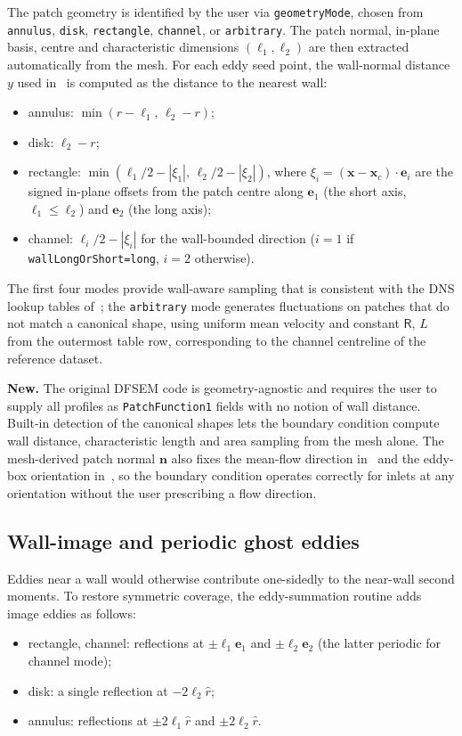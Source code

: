 \documentclass[
 amsmath,amssymb,
 aps,
 twocolumn,
]{revtex4-2}
\renewcommand{\vec}[1]{\boldsymbol{#1}}
\newcommand{\bR}{\mathsf{R}}
\newcommand{\improv}[1]{\par\medskip\noindent\textbf{#1}\hspace{0.5em}\ignorespaces}
\begin{document}
The patch geometry is identified by the user via \texttt{geometryMode},
chosen from \texttt{annulus}, \texttt{disk}, \texttt{rectangle},
\texttt{channel}, or \texttt{arbitrary}. The patch normal, in-plane
basis, centre and characteristic dimensions $(\ell_1,\ell_2)$ are then
extracted automatically from the mesh. For each eddy seed point, the
wall-normal distance $y$ used in~ is computed as the
distance to the nearest wall:
\begin{itemize}[noitemsep]
  \item annulus: $\min(r-\ell_1,\,\ell_2-r)$;
  \item disk: $\ell_2-r$;
  \item rectangle: $\min(\ell_1/2-|\xi_1|,\,\ell_2/2-|\xi_2|)$, where
    $\xi_i=(\vec x-\vec x_c)\cdot\vec e_i$ are the signed in-plane
    offsets from the patch centre along $\vec e_1$ (the short axis,
    $\ell_1\le\ell_2$) and $\vec e_2$ (the long axis);
  \item channel: $\ell_i/2-|\xi_i|$ for the wall-bounded direction
    ($i=1$ if \texttt{wallLongOrShort=long}, $i=2$ otherwise).
\end{itemize}
The first four modes provide wall-aware sampling that is consistent with
the DNS lookup tables of~; the \texttt{arbitrary} mode
generates fluctuations on patches that do not match a canonical shape,
using uniform mean velocity and constant $\bR$, $L$ from the outermost
table row, corresponding to the channel centreline of the reference dataset.

\improv{New.}
The original DFSEM code is geometry-agnostic and requires the user to supply
all profiles as \texttt{PatchFunction1} fields with no notion of wall
distance. Built-in detection of the canonical shapes lets the boundary
condition compute wall distance, characteristic length and area sampling
from the mesh alone. The mesh-derived patch normal $\vec n$ also fixes
the mean-flow direction in~ and the eddy-box orientation
in~, so the boundary condition operates correctly for inlets
at any orientation without the user prescribing a flow direction.

\subsection{Wall-image and periodic ghost eddies}\label{sec:images}

Eddies near a wall would otherwise contribute one-sidedly to the
near-wall second moments. To restore symmetric coverage, the
eddy-summation routine adds image eddies as follows:
\begin{itemize}[noitemsep]
  \item rectangle, channel: reflections at $\pm\ell_1\vec e_1$ and
    $\pm\ell_2\vec e_2$ (the latter periodic for channel mode);
  \item disk: a single reflection at $-2\ell_2\hat r$;
  \item annulus: reflections at $\pm 2\ell_1\hat r$ and
    $\pm 2\ell_2\hat r$.
\end{itemize}
\end{document}
